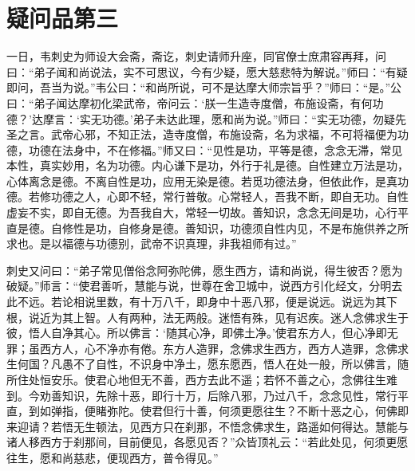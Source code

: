 \documentclass[12pt,twoside,openany]{book}
\begin{document}
\chapter{疑问品第三}
一日，韦刺史为师设大会斋，斋讫，刺史请师升座，同官僚士庶肃容再拜，问曰：“弟子闻和尚说法，实不可思议，今有少疑，愿大慈悲特为解说。”师曰：“有疑即问，吾当为说。”韦公曰：“和尚所说，可不是达摩大师宗旨乎？”师曰：“是。”公曰：“弟子闻达摩初化梁武帝，帝问云：‘朕一生造寺度僧，布施设斋，有何功德？’达摩言：‘实无功德。’弟子未达此理，愿和尚为说。”师曰：“实无功德，勿疑先圣之言。武帝心邪，不知正法，造寺度僧，布施设斋，名为求福，不可将福便为功德，功德在法身中，不在修福。”师又曰：“见性是功，平等是德，念念无滞，常见本性，真实妙用，名为功德。内心谦下是功，外行于礼是德。自性建立万法是功，心体离念是德。不离自性是功，应用无染是德。若觅功德法身，但依此作，是真功德。若修功德之人，心即不轻，常行普敬。心常轻人，吾我不断，即自无功。自性虚妄不实，即自无德。为吾我自大，常轻一切故。善知识，念念无间是功，心行平直是德。自修性是功，自修身是德。善知识，功德须自性内见，不是布施供养之所求也。是以福德与功德别，武帝不识真理，非我祖师有过。”

刺史又问曰：“弟子常见僧俗念阿弥陀佛，愿生西方，请和尚说，得生彼否？愿为破疑。”师言：“使君善听，慧能与说，世尊在舍卫城中，说西方引化经文，分明去此不远。若论相说里数，有十万八千，即身中十恶八邪，便是说远。说远为其下根，说近为其上智。人有两种，法无两般。迷悟有殊，见有迟疾。迷人念佛求生于彼，悟人自净其心。所以佛言：‘随其心净，即佛土净。’使君东方人，但心净即无罪；虽西方人，心不净亦有倦。东方人造罪，念佛求生西方，西方人造罪，念佛求生何国？凡愚不了自性，不识身中净土，愿东愿西，悟人在处一般，所以佛言，随所住处恒安乐。使君心地但无不善，西方去此不遥；若怀不善之心，念佛往生难到。今劝善知识，先除十恶，即行十万，后除八邪，乃过八千，念念见性，常行平直，到如弹指，便睹弥陀。使君但行十善，何须更愿往生？不断十恶之心，何佛即来迎请？若悟无生顿法，见西方只在刹那，不悟念佛求生，路遥如何得达。慧能与诸人移西方于刹那间，目前便见，各愿见否？”众皆顶礼云：“若此处见，何须更愿往生，愿和尚慈悲，便现西方，普令得见。”
\end{document}
